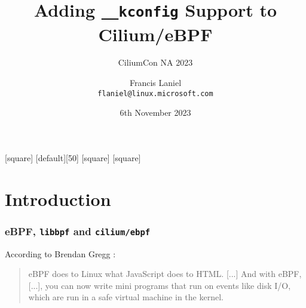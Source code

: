 \documentclass[table, trans, aspectratio = 169]{beamer}
\title[CiliumCon NA 2023]{Adding \texttt{\_\_kconfig} Support to Cilium/eBPF}
\subtitle{CiliumCon NA 2023}
\author[Francis Laniel (\texttt{flaniel@linux.microsoft.com})]{Francis Laniel\\\texttt{flaniel@linux.microsoft.com}}
\date{6th November 2023}
\begin{document}
	[square]
	[default][50]
	[square]
	[square]

	\maketitle

	\section{Introduction}
	\begin{frame}
		\frametitle{eBPF, \texttt{libbpf} and \texttt{cilium/ebpf}}

		According to Brendan Gregg \cite{gregg_learn_2019}:
		\begin{quote}
			eBPF does to Linux what JavaScript does to HTML.
			[...]
			And with eBPF, [...], you can now write mini programs that run on events like disk I/O, which are run in a safe virtual machine in the kernel.
		\end{quote}

	\end{frame}
\end{document}
